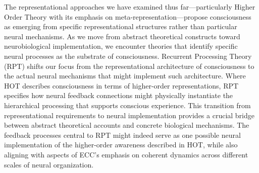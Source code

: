 The representational approaches we have examined thus far—particularly Higher Order Theory with its emphasis on meta-representation—propose consciousness as emerging from specific representational structures rather than particular neural mechanisms. As we move from abstract theoretical constructs toward neurobiological implementation, we encounter theories that identify specific neural processes as the substrate of consciousness. Recurrent Processing Theory (RPT) shifts our focus from the representational architecture of consciousness to the actual neural mechanisms that might implement such architecture. Where HOT describes consciousness in terms of higher-order representations, RPT specifies how neural feedback connections might physically instantiate the hierarchical processing that supports conscious experience. This transition from representational requirements to neural implementation provides a crucial bridge between abstract theoretical accounts and concrete biological mechanisms. The feedback processes central to RPT might indeed serve as one possible neural implementation of the higher-order awareness described in HOT, while also aligning with aspects of ECC's emphasis on coherent dynamics across different scales of neural organization.
